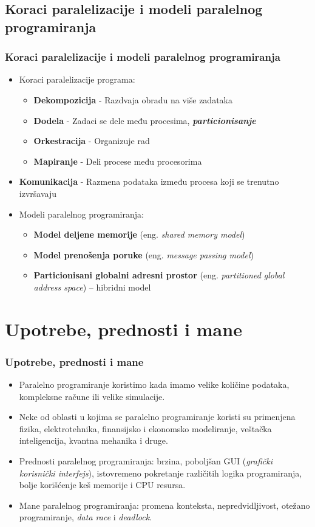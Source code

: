 \documentclass{beamer}
\begin{document}
	\subsection{Koraci paralelizacije i modeli paralelnog programiranja}
	\begin{frame}[fragile]\frametitle{Koraci paralelizacije i modeli paralelnog programiranja}
	\begin{itemize}	
		\item Koraci paralelizacije programa:
		\begin{itemize}	
			\item \textbf{Dekompozicija} - Razdvaja obradu na više zadataka
			\item \textbf{Dodela} - Zadaci se dele među procesima, \textbf{\emph{particionisanje}}
			\item \textbf{Orkestracija} - Organizuje rad
			\item \textbf{Mapiranje} - Deli procese među procesorima  
		\end{itemize} 
		\bigskip
		\item \textbf{Komunikacija} - Razmena podataka između procesa koji se trenutno izvršavaju
		\bigskip
	 		\item Modeli paralelnog programiranja:
				\begin{itemize}	
					\item \textbf{Model deljene memorije} (eng. \emph{shared memory model})
					\item \textbf{Model prenošenja poruke} (eng. \emph{message passing model})
					\item \textbf{Particionisani globalni adresni prostor} (eng. \emph{partitioned global address space}) -- hibridni model
				\end{itemize}
	\end{itemize}
	\end{frame}
	
	\section{Upotrebe, prednosti i mane}
	\begin{frame}[fragile]\frametitle{Upotrebe, prednosti i mane}
		\begin{itemize}	
			\item Paralelno programiranje koristimo kada imamo velike količine podataka, kompleksne račune ili velike simulacije.
			\item Neke od oblasti u kojima se paralelno programiranje koristi su primenjena fizika, elektrotehnika, finansijsko i ekonomsko modeliranje, veštačka inteligencija, kvantna mehanika i druge.
			\bigskip
			\item Prednosti paralelnog programiranja: brzina, poboljšan GUI (\emph{grafički korisnički interfejs}), istovremeno pokretanje različitih logika programiranja, bolje korišćenje keš memorije i CPU resursa.
			\item Mane paralelnog programiranja: promena konteksta, nepredvidljivost, otežano programiranje, \emph{data race} i \emph{deadlock}.
		\end{itemize}
	\end{frame}
	
\end{document}
